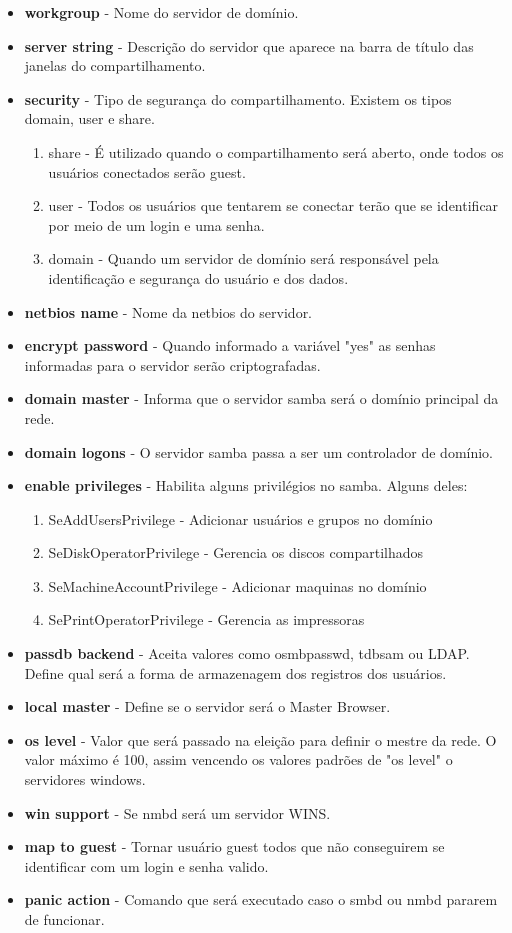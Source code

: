 \begin{itemize}
	\item \textbf{workgroup} - Nome do servidor de domínio.
	\item \textbf{server string} - Descrição do servidor que aparece na barra de título das janelas do compartilhamento.
	\item \textbf{security} - Tipo de segurança do compartilhamento. Existem os tipos domain, user e share.
		\begin{enumerate}
			\item {share}  - É utilizado quando o compartilhamento será aberto, onde todos os usuários conectados serão guest.
			\item {user} - Todos os usuários que tentarem se conectar terão que se identificar por meio de um login e uma senha.
			\item {domain} - Quando um servidor de domínio será responsável pela identificação e segurança do usuário e dos dados.
		\end{enumerate} 
	\item \textbf{netbios name} - Nome da netbios do servidor.
	\item \textbf{encrypt password} - Quando informado a variável "yes" as senhas informadas para o servidor serão criptografadas.
	\item \textbf{domain master} - Informa que o servidor samba será o domínio principal da rede.
	\item \textbf{domain logons} - O servidor samba passa a ser um controlador de domínio.
	\item \textbf{enable privileges} - Habilita alguns privilégios no samba. Alguns deles:
		\begin{enumerate}
			\item {SeAddUsersPrivilege} - Adicionar usuários e grupos no domínio 
			\item {SeDiskOperatorPrivilege} - Gerencia os discos compartilhados 
			\item {SeMachineAccountPrivilege} - Adicionar maquinas no domínio 
			\item {SePrintOperatorPrivilege} - Gerencia as impressoras
		\end{enumerate}
	\item \textbf{passdb backend} - Aceita valores como osmbpasswd, tdbsam ou LDAP. Define qual será a forma de armazenagem dos registros dos usuários.
	\item \textbf{local master} - Define se o servidor será o Master Browser.
	\item \textbf{os level} - Valor que será passado na eleição para definir o mestre da rede. O valor máximo é 100, assim vencendo os valores padrões de "os level" o servidores windows.
	\item \textbf{win support} - Se nmbd será um servidor WINS.
	\item \textbf{map to guest} - Tornar usuário guest todos que não conseguirem se identificar com um login e senha valido.
	\item \textbf{panic action} - Comando que será executado caso o smbd ou nmbd pararem de funcionar.
\end{itemize}

